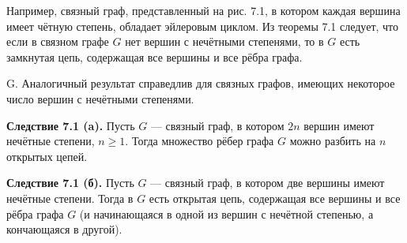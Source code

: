 Например, связный граф, представленный на рис. 7.1, в котором каждая вершина имеет чётную степень, обладает эйлеровым циклом.
Из теоремы 7.1 следует, что если в связном графе \( G \) нет вершин с нечётными степенями, то в \( G \) есть замкнутая цепь, содержащая все вершины и все рёбра графа.

G. Аналогичный результат справедлив для связных графов, имеющих некоторое число вершин с нечётными степенями.

\textbf{Следствие 7.1 (a).} Пусть \( G \) — связный граф, в котором \( 2n \) вершин имеют нечётные степени, \( n \geq 1 \). Тогда множество рёбер графа \( G \) можно разбить на \( n \) открытых цепей.

\textbf{Следствие 7.1 (б).} Пусть \( G \) — связный граф, в котором две вершины имеют нечётные степени. Тогда в \( G \) есть открытая цепь, содержащая все вершины и все рёбра графа \( G \) (и начинающаяся в одной из вершин с нечётной степенью, а кончающаяся в другой).